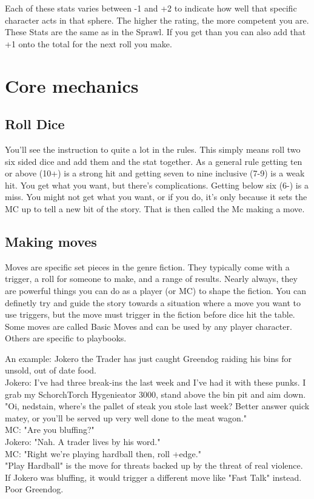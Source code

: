 \documentclass{tufte-book}
\begin{document}
Each of these stats varies between -1 and +2 to indicate how well that specific character acts in that sphere. The higher the rating, the more competent you are.  These Stats are the same as in the Sprawl. If you get  than you can also add that +1 onto the total for the next roll you make.

\section{ Core mechanics} \label{sec: core mechanics}
\subsection{Roll Dice}	\label{sec: roll dice}
You'll see the instruction to  quite a lot in the rules. This simply means roll two six sided dice and add them and the stat together. As a general rule getting ten or above (10+) is a strong hit  and getting seven to nine inclusive (7-9) is a weak hit. You get what you want, but there's complications. Getting below six (6-) is a miss. You might not get what you want, or if you do, it's only because it sets the MC up to tell a new bit of the story. That is then called the Mc making a move.

\subsection{Making moves} \label{sec: making moves}
Moves are specific set pieces in the genre fiction. They typically come with a trigger, a roll for someone to make, and a range of results. Nearly always, they are powerful things you can do as a player (or MC) to shape the fiction. You can definetly try and guide the story towards a situation where a move you want to use triggers, but the move must trigger in the fiction before dice hit the table. Some moves are called Basic Moves and can be used by any player character. Others are specific to playbooks.

An example: 
Jokero the Trader has just caught Greendog raiding his bins for unsold, out of date food. \\
Jokero: I've had three break-ins the last week and I've had it with these punks. I grab my SchorchTorch Hygenieator 3000, stand above the bin pit and aim down. "Oi, nedstain, where's the pallet of steak you stole last week? Better answer quick matey, or you'll be served up very well done to the meat wagon."\\
MC: "Are you bluffing?"\\
Jokero: "Nah. A trader lives by his word."\\
MC: "Right we're playing hardball then, roll +edge."\\
"Play Hardball" is the move for threats backed up by the threat of real violence. If Jokero was bluffing, it would trigger a different move like "Fast Talk" instead. Poor Greendog.\\
\end{document}
